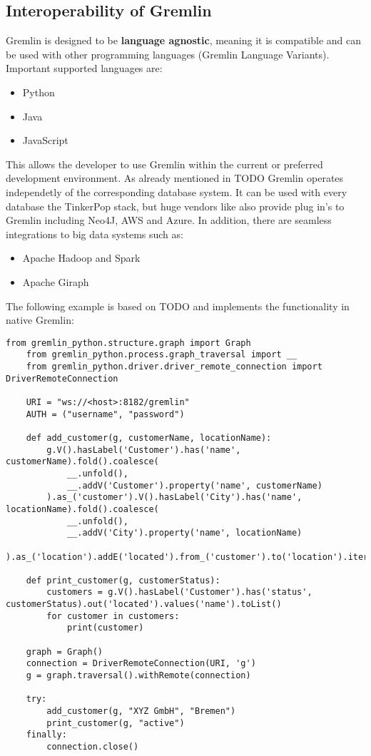 \subsection{Interoperability of Gremlin}
Gremlin is designed to be \textbf{language agnostic}, meaning it is compatible and
can be used with other programming languages (Gremlin Language Variants).
Important supported languages are:
\begin{itemize}
	\item Python
	\item Java
	\item JavaScript
\end{itemize}
This allows the developer to use Gremlin within the current or preferred 
development environment.
As already mentioned in TODO Gremlin operates independetly of the corresponding
database system. It can be used with every database the TinkerPop stack, but huge
vendors like also provide plug in's to Gremlin including Neo4J, AWS and Azure.
In addition, there are seamless integrations to big data systems such as:
\begin{itemize}
	\item Apache Hadoop and Spark
	\item Apache Giraph
\end{itemize}
The following example is based on TODO and implements the functionality in native Gremlin:
\begin{lstlisting}[caption={Interact with Gremlin via Python}, label={lst:pythonAndGremlin}]
	from gremlin_python.structure.graph import Graph
	from gremlin_python.process.graph_traversal import __
	from gremlin_python.driver.driver_remote_connection import DriverRemoteConnection

	URI = "ws://<host>:8182/gremlin"
	AUTH = ("username", "password")

	def add_customer(g, customerName, locationName):
		g.V().hasLabel('Customer').has('name', customerName).fold().coalesce(
			__.unfold(),
			__.addV('Customer').property('name', customerName)
		).as_('customer').V().hasLabel('City').has('name', locationName).fold().coalesce(
			__.unfold(),
			__.addV('City').property('name', locationName)
		).as_('location').addE('located').from_('customer').to('location').iterate()

	def print_customer(g, customerStatus):
		customers = g.V().hasLabel('Customer').has('status', customerStatus).out('located').values('name').toList()
		for customer in customers:
			print(customer)

	graph = Graph()
	connection = DriverRemoteConnection(URI, 'g')
	g = graph.traversal().withRemote(connection)

	try:
		add_customer(g, "XYZ GmbH", "Bremen")
		print_customer(g, "active")
	finally:
		connection.close()
\end{lstlisting}
